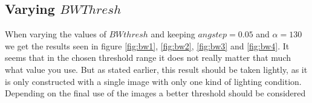 \documentclass[a4paper, 20pt]{article}
\begin{document}
\subsection{Varying $BWThresh$}
When varying the values of $BWthresh$ and keeping $angstep = 0.05$ and $\alpha=
130$ we get the results seen in figure \ref{fig:bw1}, \ref{fig:bw2},
\ref{fig:bw3} and \ref{fig:bw4}. It seems that in the chosen threshold range it
does not really matter that much what value you use.
But as stated earlier, this result should be taken lightly, as it is only
constructed with a single image with only one kind of lighting condition.
Depending on the final use of the images a better threshold should be considered
\begin{figure}[!ht]
\centering
\begin{floatrow}
\end{floatrow}
\end{figure}
\end{document}
